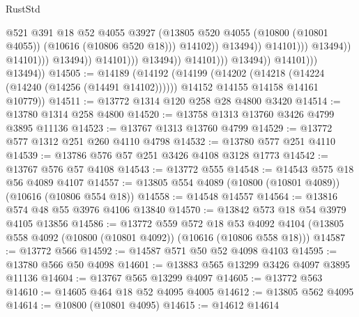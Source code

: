 \begin{lexlean}{RustStd}
\begin{coremodule}
                                                              @521
                                                              @391
                                                              @18
                                                              @52
                                                              @4055
                                                              @3927
                                                              (@13805
                                                                @520
                                                                @4055
                                                                (@10800 (@10801 @4055))
                                                                (@10616 (@10806 @520 @18)))
                                                              @14102))
                                                          @13494))
                                                      @14101)))
                                                @13494))
                                            @14101)))
                                      @13494))
                                  @14101)))
                            @13494))
                        @14101)))
                  @13494))
              @14101)))
        @13494))
@14505 := @14189
    (@14192
      (@14199
        (@14202 (@14218 (@14224 (@14240 (@14256 (@14491 @14102))))))
        @14152
        @14155
        @14158
        @14161
        @10779))
@14511 := @13772 @1314 @120 @258 @28 @4800 @3420
@14514 := @13780 @1314 @258 @4800
@14520 := @13758 @1313 @13760 @3426 @4799 @3895 @11136
@14523 := @13767 @1313 @13760 @4799
@14529 := @13772 @577 @1312 @251 @260 @4110 @4798
@14532 := @13780 @577 @251 @4110
@14539 := @13786 @576 @57 @251 @3426 @4108 @3128 @1773
@14542 := @13767 @576 @57 @4108
@14543 := @13772 @555
@14548 := @14543 @575 @18 @56 @4089 @4107
@14557 := @13805 @554 @4089 (@10800 (@10801 @4089)) (@10616 (@10806 @554 @18))
@14558 := @14548 @14557
@14564 := @13816 @574 @48 @55 @3976 @4106 @13840
@14570 := @13842 @573 @18 @54 @3979 @4105 @13856
@14586 := @13772
    @559
    @572
    @18
    @53
    @4092
    @4104
    (@13805 @558 @4092 (@10800 (@10801 @4092)) (@10616 (@10806 @558 @18)))
@14587 := @13772 @566
@14592 := @14587 @571 @50 @52 @4098 @4103
@14595 := @13780 @566 @50 @4098
@14601 := @13883 @565 @13299 @3426 @4097 @3895 @11136
@14604 := @13767 @565 @13299 @4097
@14605 := @13772 @563
@14610 := @14605 @464 @18 @52 @4095 @4005
@14612 := @13805 @562 @4095
@14614 := @10800 (@10801 @4095)
@14615 := @14612 @14614

\end{coremodule}
\end{lexlean}
